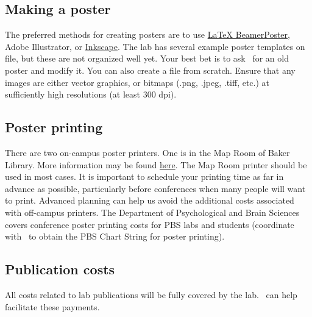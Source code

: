 \documentclass{tufte-book} %
\begin{document}
 \subsection{Making a poster}
  The preferred methods for creating posters are to use
 \href{https://github.com/deselaers/latex-beamerposter}{LaTeX
   BeamerPoster}, Adobe Illustrator, or
 \href{https://inkscape.org/en/}{Inkscape}.  The lab has several
 example poster templates on file, but these are not organized well
 yet.  Your best bet is to ask \director~for an old poster and modify
 it.  You can also create a file from scratch.  Ensure that any images
 are either vector graphics, or bitmaps (.png, .jpeg, .tiff, etc.) at
 sufficiently high resolutions (at least 300 dpi).


 \subsection{Poster printing}
 There are two on-campus poster printers.  One is in the Map Room of
 Baker Library.  More information may be found
 \href{http://www.dartmouth.edu/~library/maproom/printingfaq.html}{here}.
 The Map Room printer should be used in most cases.  It is important
 to schedule your printing time as far in advance as possible,
 particularly before conferences when many people will want to print.
 Advanced planning can help us avoid the additional costs associated
 with off-campus printers.  The Department of Psychological and Brain
 Sciences covers conference poster printing costs for PBS labs and
 students (coordinate with \coordinator~to obtain the PBS Chart String
 for poster printing).


 \subsection{Publication costs}
All costs related to lab publications will be fully covered by the
lab.  \coordinator~can help facilitate these payments.
\end{document}

